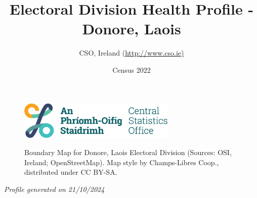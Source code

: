 \documentclass{article}
\title{Electoral Division Health Profile - Donore, Laois}
\date{Census 2022}
\author{CSO, Ireland  (\url{http://www.cso.ie)}}
\begin{document}


\begin{figure}
	\centering
\includegraphics[width =75mm]{../figures/CSO_Logo.png}
\end{figure}

\begin{figure}[h]
	\centering
	\setlength{\fboxsep}{1pt}
	\caption{\normalsize Boundary Map for Donore, Laois Electoral Division (Sources: OSI, Ireland; OpenStreetMap). Map style by Champs-Libres Coop., distributed under CC BY-SA.}
	\label{fig:2ae19629-1a6a-13a3-e055-000000000001}
	\end{figure}
	{\let\newpage\relax\maketitle}
	     \begin{center}
         \emph{Profile generated on 21/10/2024}
     \end{center}
\end{document}
